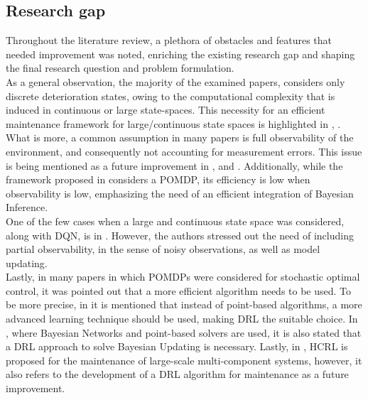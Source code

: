 

\subsection{Research gap}

Throughout the literature review, a plethora of obstacles and features that needed improvement was noted, enriching the existing research gap and shaping the final research question and problem formulation. \\

As a general observation, the majority of the examined papers, considers only discrete deterioration states, owing to the computational complexity that is induced in continuous or large state-spaces. This necessity for an efficient maintenance framework for large/continuous state spaces is highlighted in \cite{compare2018markov}, \cite{papakonstantinou2014planning2}.\\

What is more, a common assumption in many papers is full observability of the environment, and consequently not accounting for measurement errors. This issue is being mentioned as a future improvement in \cite{compare2018markov}, \cite{memarzadeh2019model} and \cite{rocchetta2019reinforcement}. Additionally, while the framework proposed in \cite{hausknecht2015deep} considers a \gls{POMDP}, its efficiency is low when observability is low, emphasizing the need of an efficient integration of Bayesian Inference.\\

One of the few cases when a large and continuous state space was considered, along with \gls{DQN}, is in \cite{rocchetta2019reinforcement}. However, the authors stressed out the need of including partial observability, in the sense of noisy observations, as well as model updating.\\

Lastly, in many papers in which \glspl{POMDP} were considered for stochastic optimal control, it was pointed out that a more efficient algorithm needs to be used. To be more precise, in \cite{andriotis2021value} it is mentioned that instead of point-based algorithms, a more advanced learning technique should be used, making \gls{DRL} the suitable choice. In \cite{morato2022optimal}, where Bayesian Networks and point-based solvers are used, it is also stated that a \gls{DRL} approach to solve Bayesian Updating is necessary. Lastly, in \cite{zhou2022maintenance}, \gls{HCRL} is proposed for the maintenance of large-scale multi-component systems, however, it also refers to the development of a \gls{DRL} algorithm for maintenance as a future improvement.

